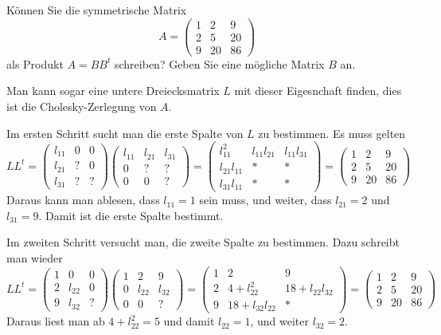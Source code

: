 Können Sie die symmetrische Matrix
\[
A=\begin{pmatrix}
1& 2& 9\\
2& 5&20\\
9&20&86
\end{pmatrix}
\]
als Produkt $A=BB^t$ schreiben? Geben Sie eine mögliche Matrix $B$ an.

\begin{loesung}
Man kann sogar eine untere Dreiecksmatrix $L$ mit dieser Eigesnchaft finden,
dies ist die Cholesky-Zerlegung von $A$.

Im ersten Schritt sucht man die erste Spalte von $L$ zu bestimmen.
Es muss gelten
\[
LL^t=
\begin{pmatrix}
l_{11}&  0&  0\\
l_{21}&  ?&  0\\
l_{31}&  ?&  ?
\end{pmatrix}
\begin{pmatrix}
l_{11}&l_{21}&l_{31}\\
     0&     ?&     ?\\
     0&     0&     ?
\end{pmatrix}
=
\begin{pmatrix}
    l_{11}^2&l_{11}l_{21}&l_{11}l_{31}\\
l_{21}l_{11}&           *&           *\\
l_{31}l_{11}&           *&           *
\end{pmatrix}
=
\begin{pmatrix}
1& 2& 9\\
2& 5&20\\
9&20&86
\end{pmatrix}
\]
Daraus kann man ablesen, dass $l_{11}=1$ sein muss, und weiter,
dass
$l_{21}=2$ und $l_{31}=9$. Damit ist die erste Spalte bestimmt.

Im zweiten Schritt versucht man, die zweite Spalte zu bestimmen.
Dazu schreibt man wieder
\[
LL^t
=
\begin{pmatrix}
1&     0&0\\
2&l_{22}&0\\
9&l_{32}&?
\end{pmatrix}
\begin{pmatrix}
1&     2&     9\\
0&l_{22}&l_{32}\\
0&     0&?
\end{pmatrix}
=
\begin{pmatrix}
1&2           &           9\\
2&4+l_{22}^2  &18+l_{22}l_{32}\\
9&18+l_{32}l_{22}&         *
\end{pmatrix}
=
\begin{pmatrix}
1& 2& 9\\
2& 5&20\\
9&20&86
\end{pmatrix}
\]
Daraus liest man ab $4+l_{22}^2=5$ und damit $l_{22}=1$, und weiter
$l_{32}=2$.


\end{loesung}
